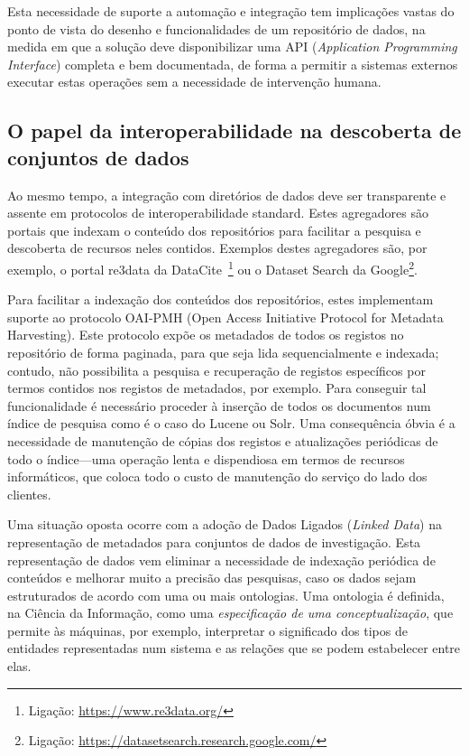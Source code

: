 \documentclass[sigconf,nonacm]{acmart}
\begin{document}
Esta necessidade de suporte a automação e integração tem implicações vastas do ponto de vista do desenho e funcionalidades de um repositório de dados, na medida em que a solução deve disponibilizar uma API (\textit{Application Programming Interface}) completa e bem documentada, de forma a permitir a sistemas externos executar estas operações sem a necessidade de intervenção humana.

\subsection{O papel da interoperabilidade na descoberta de conjuntos de dados} %
\label{sub:o_papel_da_interoperabilidade_na_descoberta_de_conjuntos_de_dados}

Ao mesmo tempo, a integração com diretórios de dados deve ser transparente e assente em protocolos de interoperabilidade standard. Estes agregadores são portais que indexam o conteúdo dos repositórios para facilitar a pesquisa e descoberta de recursos neles contidos. Exemplos destes agregadores são, por exemplo, o portal re3data da DataCite~\footnote{Ligação: \url{https://www.re3data.org/}} ou o Dataset Search da Google\footnote{Ligação: \url{https://datasetsearch.research.google.com/}}.

Para facilitar a indexação dos conteúdos dos repositórios, estes implementam suporte ao protocolo OAI-PMH (Open Access Initiative Protocol for Metadata Harvesting). Este protocolo expõe os metadados de todos os registos no repositório de forma paginada, para que seja lida sequencialmente e indexada; contudo, não possibilita a pesquisa e recuperação de registos específicos por termos contidos nos registos de metadados, por exemplo. Para conseguir tal funcionalidade é necessário proceder à inserção de todos os documentos num índice de pesquisa como é o caso do Lucene ou Solr. Uma consequência óbvia é a necessidade de manutenção de cópias dos registos e atualizações periódicas de todo o índice---uma operação lenta e dispendiosa em termos de recursos informáticos, que coloca todo o custo de manutenção do serviço do lado dos clientes.

Uma situação oposta ocorre com a adoção de Dados Ligados (\textit{Linked Data}) na representação de metadados para conjuntos de dados de investigação. Esta representação de dados vem eliminar a necessidade de indexação periódica de conteúdos e melhorar muito a precisão das pesquisas, caso os dados sejam estruturados de acordo com uma ou mais ontologias. Uma ontologia é definida, na Ciência da Informação, como uma \textit{especificação de uma conceptualização}\cite{gruber1995toward}, que permite às máquinas, por exemplo, interpretar o significado dos tipos de entidades representadas num sistema e as relações que se podem estabelecer entre elas.
\end{document}
